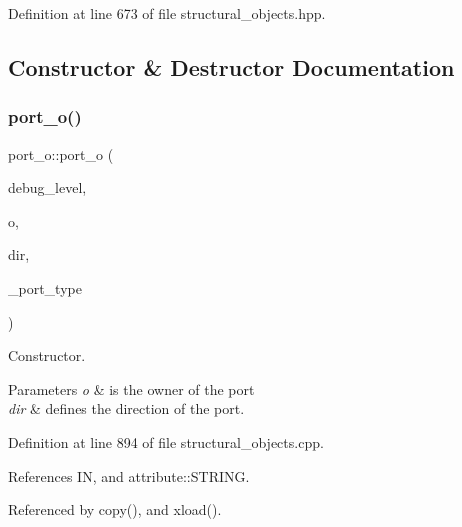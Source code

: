 Definition at line 673 of file structural\+\_\+objects.\+hpp.



\subsection{Constructor \& Destructor Documentation}
\mbox{\label{structport__o_abdee309e228cb9b4e085ce1a3d5ae41d}} 
\subsubsection{\texorpdfstring{port\+\_\+o()}{port\_o()}}
{\footnotesize\ttfamily port\+\_\+o\+::port\+\_\+o (\begin{DoxyParamCaption}\item[{int}]{debug\+\_\+level,  }\item[{const \hyperlink{structural__objects_8hpp_a8ea5f8cc50ab8f4c31e2751074ff60b2}{structural\+\_\+object\+Ref}}]{o,  }\item[{\hyperlink{structport__o_adb254df5665ff28b0769491cc3899fd5}{port\+\_\+direction}}]{dir,  }\item[{\hyperlink{structural__objects_8hpp_acf52399aecacb7952e414c5746ce6439}{so\+\_\+kind}}]{\+\_\+port\+\_\+type }\end{DoxyParamCaption})}



Constructor. 


\begin{DoxyParams}{Parameters}
{\em o} & is the owner of the port \\
\hline
{\em dir} & defines the direction of the port. \\
\hline
\end{DoxyParams}


Definition at line 894 of file structural\+\_\+objects.\+cpp.



References IN, and attribute\+::\+S\+T\+R\+I\+NG.



Referenced by copy(), and xload().


